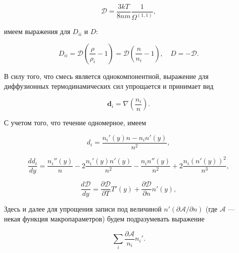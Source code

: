 \documentclass[12pt]{article}
\begin{document}
\begin{equation}
  \mathcal{D} = \frac{3kT}{8nm}\frac{1}{\Omega^{(1,1)}},
\end{equation}

имеем выражения для $D_{ii}$ и $D$:

\begin{equation}
  D_{ii} = \mathcal{D} \left(\frac{\rho}{\rho_{i}} - 1 \right)=\mathcal{D} \left(\frac{n}{n_{i}} - 1 \right),\quad D = -\mathcal{D}.
\end{equation}

В силу того, что смесь является однокомпонентной, выражение для диффузионных термодинамических сил упрощается и принимает вид

\begin{equation}
  \mathbf{d}_{i} = \nabla \left(\frac{n_{i}}{n} \right).
\end{equation}

С учетом того, что течение одномерное, имеем

\begin{equation}
  d_{i} = \frac{n_{i}'(y)n - n_{i}n'(y)}{n^2},
\end{equation}

\begin{equation}
  \frac{d d_{i}}{d y} = \frac{n_{i}''(y)}{n} - 2\frac{n_{i}'(y)n'(y)}{n^2} - \frac{n_{i}n''(y)}{n^2} + 2\frac{n_{i}\left(n'(y) \right)^2}{n^3},
\end{equation}

\begin{equation}
  \frac{d\mathcal{D}}{dy} = \frac{\partial \mathcal{D}}{\partial T} T'(y) + \frac{\partial \mathcal{D}}{\partial n} n'(y),
\end{equation}


Здесь и далее для упрощения записи под величиной $n' (\partial \mathcal{A} / \partial n)$ (где $\mathcal{A}$ --- некая функция макропараметров) будем подразумевать выражение

\begin{equation}
  \sum_{i} \frac{\partial \mathcal{A}}{n_{i}}n_{i}'.
\end{equation}
\end{document}
